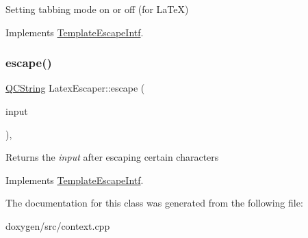 Setting tabbing mode on or off (for La\+TeX) 

Implements \mbox{\hyperlink{class_template_escape_intf_a40faf7453afe73ccdb52fa8d2619ac3d}{Template\+Escape\+Intf}}.

\mbox{\label{class_latex_escaper_ac6db140f510d46ce4f169546adbc5cb6}} 
\subsubsection{\texorpdfstring{escape()}{escape()}}
{\footnotesize\ttfamily \mbox{\hyperlink{class_q_c_string}{Q\+C\+String}} Latex\+Escaper\+::escape (\begin{DoxyParamCaption}\item[{const \mbox{\hyperlink{class_q_c_string}{Q\+C\+String}} \&}]{input }\end{DoxyParamCaption})\hspace{0.3cm}{\ttfamily [inline]}, {\ttfamily [virtual]}}

Returns the {\itshape input} after escaping certain characters 

Implements \mbox{\hyperlink{class_template_escape_intf_a9fc463a8281aca9f982866aa26d4f401}{Template\+Escape\+Intf}}.



The documentation for this class was generated from the following file\+:\begin{DoxyCompactItemize}
\item 
doxygen/src/context.\+cpp\end{DoxyCompactItemize}
